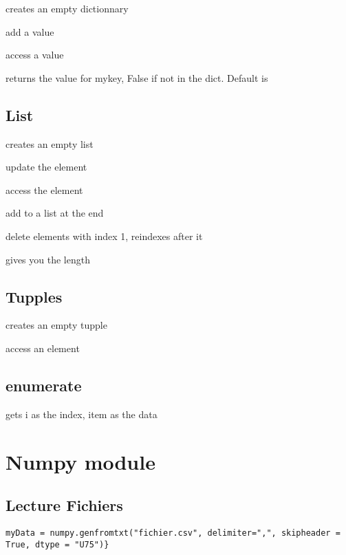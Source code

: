 		 creates an empty dictionnary

		 add a value

		 access a value

		 returns the value for mykey, False if not in the dict. Default is 

	\subsection{List}

		 creates an empty list


		 update the element

		 access the element

		  add to a list at the end

		 delete elements with index 1, reindexes after it

		 gives you the length

	\subsection{Tupples}
		
		 creates an empty tupple


		 access an element


	\subsection{enumerate}

		 gets i as the index, item as the data

\section{Numpy module}

	\subsection{Lecture Fichiers}
		
\begin{lstlisting}
myData = numpy.genfromtxt("fichier.csv", delimiter=",", skipheader = True, dtype = "U75")}
\end{lstlisting}

